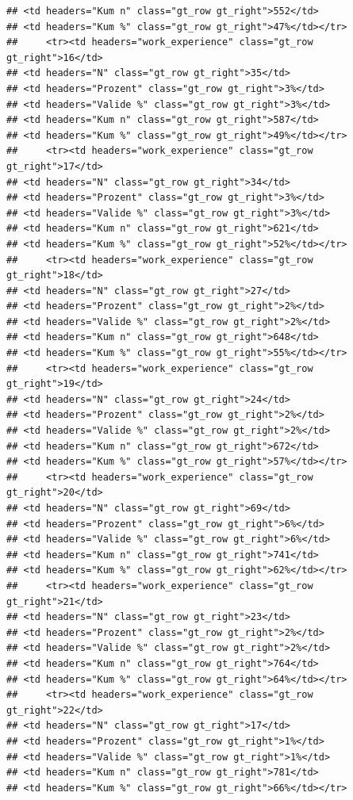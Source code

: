 \documentclass[
  a4paper,
  DIV=11,
  numbers=noendperiod]{scrartcl}
\begin{document}
\begin{verbatim}
## <td headers="Kum n" class="gt_row gt_right">552</td>
## <td headers="Kum %" class="gt_row gt_right">47%</td></tr>
##     <tr><td headers="work_experience" class="gt_row gt_right">16</td>
## <td headers="N" class="gt_row gt_right">35</td>
## <td headers="Prozent" class="gt_row gt_right">3%</td>
## <td headers="Valide %" class="gt_row gt_right">3%</td>
## <td headers="Kum n" class="gt_row gt_right">587</td>
## <td headers="Kum %" class="gt_row gt_right">49%</td></tr>
##     <tr><td headers="work_experience" class="gt_row gt_right">17</td>
## <td headers="N" class="gt_row gt_right">34</td>
## <td headers="Prozent" class="gt_row gt_right">3%</td>
## <td headers="Valide %" class="gt_row gt_right">3%</td>
## <td headers="Kum n" class="gt_row gt_right">621</td>
## <td headers="Kum %" class="gt_row gt_right">52%</td></tr>
##     <tr><td headers="work_experience" class="gt_row gt_right">18</td>
## <td headers="N" class="gt_row gt_right">27</td>
## <td headers="Prozent" class="gt_row gt_right">2%</td>
## <td headers="Valide %" class="gt_row gt_right">2%</td>
## <td headers="Kum n" class="gt_row gt_right">648</td>
## <td headers="Kum %" class="gt_row gt_right">55%</td></tr>
##     <tr><td headers="work_experience" class="gt_row gt_right">19</td>
## <td headers="N" class="gt_row gt_right">24</td>
## <td headers="Prozent" class="gt_row gt_right">2%</td>
## <td headers="Valide %" class="gt_row gt_right">2%</td>
## <td headers="Kum n" class="gt_row gt_right">672</td>
## <td headers="Kum %" class="gt_row gt_right">57%</td></tr>
##     <tr><td headers="work_experience" class="gt_row gt_right">20</td>
## <td headers="N" class="gt_row gt_right">69</td>
## <td headers="Prozent" class="gt_row gt_right">6%</td>
## <td headers="Valide %" class="gt_row gt_right">6%</td>
## <td headers="Kum n" class="gt_row gt_right">741</td>
## <td headers="Kum %" class="gt_row gt_right">62%</td></tr>
##     <tr><td headers="work_experience" class="gt_row gt_right">21</td>
## <td headers="N" class="gt_row gt_right">23</td>
## <td headers="Prozent" class="gt_row gt_right">2%</td>
## <td headers="Valide %" class="gt_row gt_right">2%</td>
## <td headers="Kum n" class="gt_row gt_right">764</td>
## <td headers="Kum %" class="gt_row gt_right">64%</td></tr>
##     <tr><td headers="work_experience" class="gt_row gt_right">22</td>
## <td headers="N" class="gt_row gt_right">17</td>
## <td headers="Prozent" class="gt_row gt_right">1%</td>
## <td headers="Valide %" class="gt_row gt_right">1%</td>
## <td headers="Kum n" class="gt_row gt_right">781</td>
## <td headers="Kum %" class="gt_row gt_right">66%</td></tr>

\end{verbatim}
\end{document}
